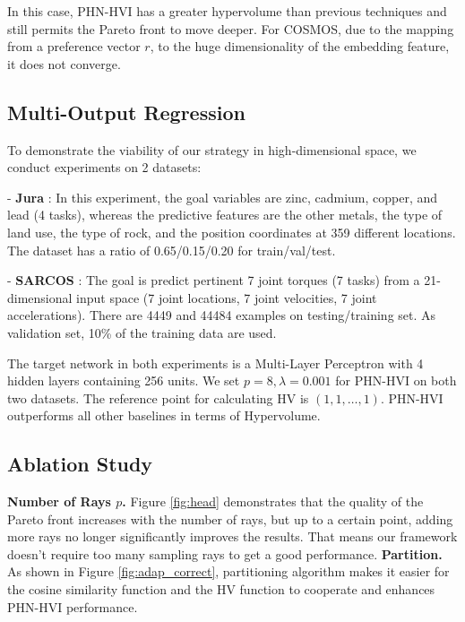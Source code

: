 \documentclass[letterpaper]{article} %
\newcommand{\ourmodel}{PHN-HVI }
\begin{document}
In this case, \ourmodel has a greater hypervolume than previous techniques and still permits the Pareto front to move deeper. For COSMOS, due to the mapping from a preference vector $r$, to the huge dimensionality of the embedding feature, it does not converge.

\subsection{Multi-Output Regression}
To demonstrate the viability of our strategy in high-dimensional space, we conduct experiments on 2 datasets:

\indent - \textbf{Jura} \cite{Goovaerts1997}: In this experiment, the goal variables are zinc, cadmium, copper, and lead (4 tasks), whereas the predictive features are the other metals, the type of land use, the type of rock, and the position coordinates at 359 different locations. The dataset has a ratio of 0.65/0.15/0.20 for train/val/test.

\indent - \textbf{SARCOS} \cite{Sethu2000}:  The goal is predict pertinent 7 joint torques (7 tasks) from a 21-dimensional input space (7 joint locations, 7 joint velocities, 7 joint accelerations). There are 4449 and 44484 examples on testing/training set. As validation set, 10\% of the training data are used.

The target network in both experiments is a Multi-Layer Perceptron with 4 hidden layers containing 256 units. We set $p=8, \lambda=0.001$ for \ourmodel on both two datasets. The reference point for calculating HV is $(1, 1, \dots, 1)$. \ourmodel outperforms all other baselines in terms of Hypervolume.

\subsection{Ablation Study}
\textbf{Number of Rays $p$.} Figure \ref{fig:head} demonstrates that the quality of the Pareto front increases with the number of rays, but up to a certain point, adding more rays no longer significantly improves the results. That means our framework doesn't require too many sampling rays to get a good performance.
\indent \textbf{Partition.} As shown in Figure \ref{fig:adap_correct}, partitioning algorithm makes it easier for the cosine similarity function and the HV function to cooperate and enhances \ourmodel performance.
\end{document}

